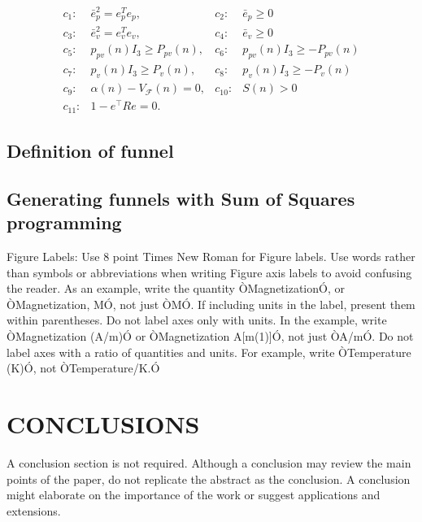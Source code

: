 \documentclass[letterpaper, 10 pt, conference]{ieeeconf}  %
\begin{document}
\begin{equation}
\begin{array}{rlrl}
c_1:& \bar{e}_p^2 = e_p^Te_p,           & c_2:&\bar{e}_p \geq 0 \\
c_3:& \bar{e}_v^2 = e_v^Te_v,           & c_4:&\bar{e}_v \geq 0 \\
c_5:& p_{pv}(n)I_3 \geq P_{pv}(n),      & c_6:&p_{pv}(n)I_3 \geq -P_{pv}(n) \\
c_7:& p_{ v}(n)I_3 \geq P_{ v}(n),      & c_8:&p_{ v}(n)I_3 \geq -P_{ v}(n) \\
c_9:& \alpha(n) - V_\mathcal{F}(n) = 0, & c_{10}:&S(n) > 0 \\
c_{11}:& 1-e^\intercal R e = 0. &&
\end{array} \nonumber
\end{equation}

\subsection{Definition of funnel}
\subsection{Generating funnels with Sum of Squares programming}


Figure Labels: Use 8 point Times New Roman for Figure labels. Use words rather than symbols or abbreviations when writing Figure axis labels to avoid confusing the reader. As an example, write the quantity ÒMagnetizationÓ, or ÒMagnetization, MÓ, not just ÒMÓ. If including units in the label, present them within parentheses. Do not label axes only with units. In the example, write ÒMagnetization (A/m)Ó or ÒMagnetization {A[m(1)]}Ó, not just ÒA/mÓ. Do not label axes with a ratio of quantities and units. For example, write ÒTemperature (K)Ó, not ÒTemperature/K.Ó

\section{CONCLUSIONS}

A conclusion section is not required. Although a conclusion may review the main points of the paper, do not replicate the abstract as the conclusion. A conclusion might elaborate on the importance of the work or suggest applications and extensions. 

\addtolength{\textheight}{-12cm}   %
\end{document}
